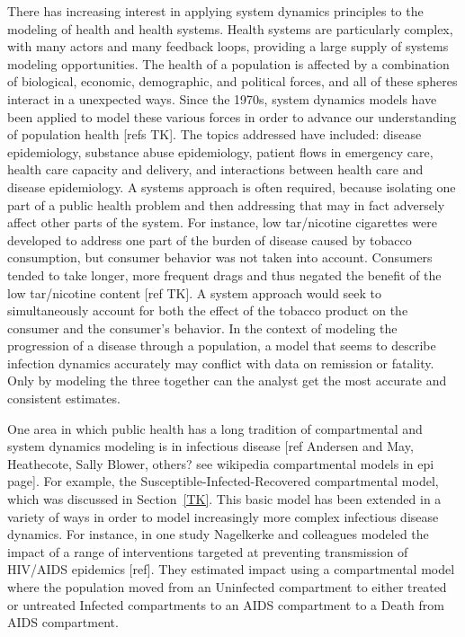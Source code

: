 There has increasing interest in applying system dynamics principles
to the modeling of health and health systems. Health systems are
particularly complex, with many actors and many feedback loops,
providing a large supply of systems modeling opportunities. The health
of a population is affected by a combination of biological, economic,
demographic, and political forces, and all of these spheres interact
in a unexpected ways. Since the 1970s, system dynamics models have
been applied to model these various forces in order to advance our
understanding of population health [refs TK]. The topics addressed
have included: disease epidemiology, substance abuse epidemiology,
patient flows in emergency care, health care capacity and delivery,
and interactions between health care and disease epidemiology. A
systems approach is often required, because isolating one part of a
public health problem and then addressing that may in fact adversely
affect other parts of the system. For instance, low tar/nicotine
cigarettes were developed to address one part of the burden of disease
caused by tobacco consumption, but consumer behavior was not taken
into account. Consumers tended to take longer, more frequent drags and
thus negated the benefit of the low tar/nicotine content [ref TK]. A
system approach would seek to simultaneously account for both the
effect of the tobacco product on the consumer and the consumer's
behavior. In the context of modeling the progression of a disease
through a population, a model that seems to describe infection
dynamics accurately may conflict with data on remission or
fatality. Only by modeling the three together can the analyst get the
most accurate and consistent estimates.

One area in which public health has a long tradition of compartmental
and system dynamics modeling is in infectious disease [ref Andersen
  and May, Heathecote, Sally Blower, others? see wikipedia
  compartmental models in epi page]. For example, the
Susceptible-Infected-Recovered compartmental model, which was discussed in
Section~\ref{TK}. This basic model has been extended in a variety of
ways in order to model increasingly more complex infectious disease
dynamics. For instance, in one study Nagelkerke and colleagues modeled
the impact of a range of interventions targeted at preventing
transmission of HIV/AIDS epidemics [ref]. They estimated impact using a
compartmental model where the population moved from an Uninfected
compartment to either treated or untreated Infected
compartments to an AIDS compartment to a Death from AIDS
compartment. 

